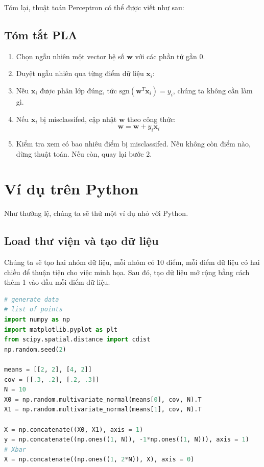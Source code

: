 Tóm lại, thuật toán Perceptron có thể được viết như sau: 
 
 
\subsection{Tóm tắt PLA }
\begin{enumerate}
\item Chọn ngẫu nhiên một vector hệ số $\mathbf{w}$ với các phần tử gần 0. 
\item Duyệt ngẫu nhiên qua từng điểm dữ liệu $\mathbf{x}_i$: 
    \item Nếu $\mathbf{x}_i$ được phân lớp đúng, tức $\text{sgn}(\mathbf{w}^T\mathbf{x}_i) = y_i$, chúng ta không cần làm gì. 
    \item Nếu $\mathbf{x}_i$ bị misclassifed, cập nhật $\mathbf{w}$ theo công thức: 
    \begin{equation} 
    \mathbf{w} = \mathbf{w} + y_i\mathbf{x}_i 
    \end{equation} 
\item Kiểm tra xem có bao nhiêu điểm bị misclassifed. Nếu không còn điểm nào, dừng thuật toán. Nếu còn, quay lại bước 2. 
\end{enumerate}
 
 
 
 
\section{Ví dụ trên Python}
Như thường lệ, chúng ta sẽ thử một ví dụ nhỏ với Python. 
 
 
\subsection{Load thư viện và tạo dữ liệu}
Chúng ta sẽ tạo hai nhóm dữ liệu, mỗi nhóm có 10 điểm, mỗi điểm dữ liệu có hai chiều để thuận tiện cho việc minh họa. Sau đó, tạo dữ liệu mở rộng bằng cách thêm 1 vào đầu mỗi điểm dữ liệu.  
 
 
\begin{lstlisting}[language=Python]
# generate data 
# list of points  
import numpy as np  
import matplotlib.pyplot as plt 
from scipy.spatial.distance import cdist 
np.random.seed(2) 
 
means = [[2, 2], [4, 2]] 
cov = [[.3, .2], [.2, .3]] 
N = 10 
X0 = np.random.multivariate_normal(means[0], cov, N).T 
X1 = np.random.multivariate_normal(means[1], cov, N).T 
 
X = np.concatenate((X0, X1), axis = 1) 
y = np.concatenate((np.ones((1, N)), -1*np.ones((1, N))), axis = 1) 
# Xbar  
X = np.concatenate((np.ones((1, 2*N)), X), axis = 0) 
\end{lstlisting}
 
